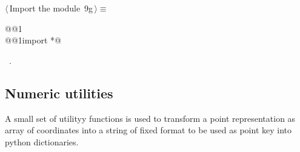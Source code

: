 \documentclass[11pt,oneside]{article}	%
\begin{document}
\begin{flushleft} \small \label{scrap25}
\protect{}$\langle\,$Import the module\nobreak\ {\footnotesize 9g}$\,\rangle\equiv$
\vspace{-1ex}
\begin{list}{}{} \item
\mbox{}\verb@import @@1\verb@@\\
\mbox{}\verb@from @@1\verb@ import *@\\
\mbox{}\verb@@{\NWsep}
\end{list}
\vspace{-1ex}
\footnotesize\addtolength{\baselineskip}{-1ex}
\begin{list}{}{\setlength{\itemsep}{-\parsep}\setlength{\itemindent}{-\leftmargin}}
\item \NWtxtMacroRefIn\ .
\end{list}
\end{flushleft}


\subsection{Numeric utilities}

A small set of utilityy functions is used to transform a point representation as array of coordinates into a string of fixed format to be used as point key into python dictionaries.
\end{document}
